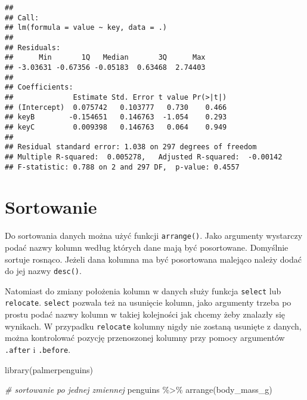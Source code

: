 \documentclass[
]{book}
\newenvironment{Shaded}{\begin{snugshade}}{\end{snugshade}}
\newcommand{\CommentTok}[1]{\textcolor[rgb]{0.56,0.35,0.01}{\textit{#1}}}
\newcommand{\FunctionTok}[1]{\textcolor[rgb]{0.00,0.00,0.00}{#1}}
\newcommand{\NormalTok}[1]{#1}
\newcommand{\SpecialCharTok}[1]{\textcolor[rgb]{0.00,0.00,0.00}{#1}}
\begin{document}
\begin{verbatim}
## 
## Call:
## lm(formula = value ~ key, data = .)
## 
## Residuals:
##      Min       1Q   Median       3Q      Max 
## -3.03631 -0.67356 -0.05183  0.63468  2.74403 
## 
## Coefficients:
##              Estimate Std. Error t value Pr(>|t|)
## (Intercept)  0.075742   0.103777   0.730    0.466
## keyB        -0.154651   0.146763  -1.054    0.293
## keyC         0.009398   0.146763   0.064    0.949
## 
## Residual standard error: 1.038 on 297 degrees of freedom
## Multiple R-squared:  0.005278,   Adjusted R-squared:  -0.00142 
## F-statistic: 0.788 on 2 and 297 DF,  p-value: 0.4557
\end{verbatim}

\hypertarget{sortowanie}{%
\section{Sortowanie}\label{sortowanie}}

Do sortowania danych można użyć funkcji \texttt{arrange()}. Jako argumenty wystarczy podać nazwy kolumn według których dane mają być posortowane. Domyślnie sortuje rosnąco. Jeżeli dana kolumna ma być posortowana malejąco należy dodać do jej nazwy \texttt{desc()}.

Natomiast do zmiany położenia kolumn w danych służy funkcja \texttt{select} lub \texttt{relocate}. \texttt{select} pozwala też na usunięcie kolumn, jako argumenty trzeba po prostu podać nazwy kolumn w takiej kolejności jak chcemy żeby znalazły się wynikach. W przypadku \texttt{relocate} kolumny nigdy nie zostaną usunięte z danych, można kontrolować pozycję przenoszonej kolumny przy pomocy argumentów \texttt{.after} i \texttt{.before}.

\begin{Shaded}
\begin{Highlighting}[]
\FunctionTok{library}\NormalTok{(palmerpenguins)}

\CommentTok{\# sortowanie po jednej zmiennej}
\NormalTok{penguins }\SpecialCharTok{\%\textgreater{}\%} \FunctionTok{arrange}\NormalTok{(body\_mass\_g)}
\end{Highlighting}
\end{Shaded}
\end{document}
